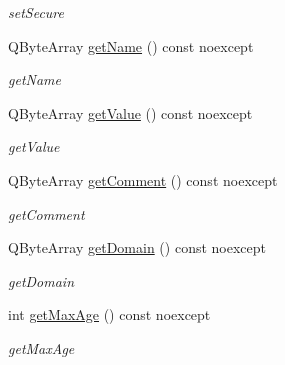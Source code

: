 \begin{DoxyCompactItemize}
\begin{DoxyCompactList}\small\item\em set\+Secure \end{DoxyCompactList}\item 
\mbox{\label{class_http_cookie_ad3370987b4bce5447598d1014c0d0f3b}} 
Q\+Byte\+Array \hyperlink{class_http_cookie_ad3370987b4bce5447598d1014c0d0f3b}{get\+Name} () const noexcept
\begin{DoxyCompactList}\small\item\em get\+Name \end{DoxyCompactList}\item 
\mbox{\label{class_http_cookie_accaa975ced5c52bb8d5f4057a6bfa08d}} 
Q\+Byte\+Array \hyperlink{class_http_cookie_accaa975ced5c52bb8d5f4057a6bfa08d}{get\+Value} () const noexcept
\begin{DoxyCompactList}\small\item\em get\+Value \end{DoxyCompactList}\item 
\mbox{\label{class_http_cookie_a76890b2f2990c4b6eff5ab34957362ab}} 
Q\+Byte\+Array \hyperlink{class_http_cookie_a76890b2f2990c4b6eff5ab34957362ab}{get\+Comment} () const noexcept
\begin{DoxyCompactList}\small\item\em get\+Comment \end{DoxyCompactList}\item 
\mbox{\label{class_http_cookie_ab43fbcb808b4e8984a8ac5568c8c49e4}} 
Q\+Byte\+Array \hyperlink{class_http_cookie_ab43fbcb808b4e8984a8ac5568c8c49e4}{get\+Domain} () const noexcept
\begin{DoxyCompactList}\small\item\em get\+Domain \end{DoxyCompactList}\item 
\mbox{\label{class_http_cookie_a1389aee86b12fe9e62929caa8799704a}} 
int \hyperlink{class_http_cookie_a1389aee86b12fe9e62929caa8799704a}{get\+Max\+Age} () const noexcept
\begin{DoxyCompactList}\small\item\em get\+Max\+Age \end{DoxyCompactList}\item 

\end{DoxyCompactItemize}

